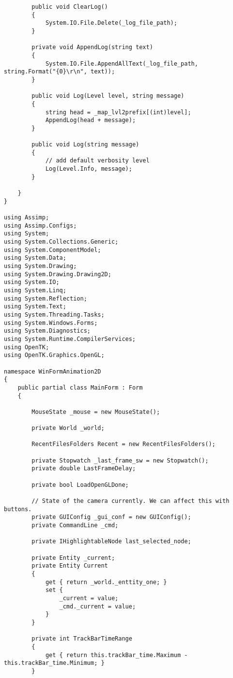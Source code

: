 \begin{scriptsize}
\begin{verbatim}
        public void ClearLog()
        {
            System.IO.File.Delete(_log_file_path);
        }

        private void AppendLog(string text)
        {
            System.IO.File.AppendAllText(_log_file_path, string.Format("{0}\r\n", text));
        }

        public void Log(Level level, string message)
        {
            string head = _map_lvl2prefix[(int)level];
            AppendLog(head + message);
        }

        public void Log(string message)
        {
            // add default verbosity level
            Log(Level.Info, message);
        }

    }
}

using Assimp;
using Assimp.Configs;
using System;
using System.Collections.Generic;
using System.ComponentModel;
using System.Data;
using System.Drawing;
using System.Drawing.Drawing2D;
using System.IO;
using System.Linq;
using System.Reflection;
using System.Text;
using System.Threading.Tasks;
using System.Windows.Forms;
using System.Diagnostics;
using System.Runtime.CompilerServices;
using OpenTK;
using OpenTK.Graphics.OpenGL;

namespace WinFormAnimation2D
{
    public partial class MainForm : Form
    {

        MouseState _mouse = new MouseState();

        private World _world;

        RecentFilesFolders Recent = new RecentFilesFolders();

        private Stopwatch _last_frame_sw = new Stopwatch();
        private double LastFrameDelay;

        private bool LoadOpenGLDone;

        // State of the camera currently. We can affect this with buttons.
        private GUIConfig _gui_conf = new GUIConfig();
        private CommandLine _cmd;

        private IHighlightableNode last_selected_node;

        private Entity _current;
        private Entity Current
        {
            get { return _world._enttity_one; }
            set {
                _current = value;
                _cmd._current = value;
            }
        }

        private int TrackBarTimeRange
        {
            get { return this.trackBar_time.Maximum - this.trackBar_time.Minimum; }
        }


\end{verbatim}
\end{scriptsize}
